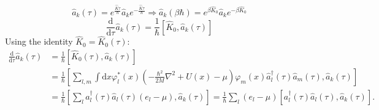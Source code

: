 \documentclass[11pt, a4paper]{article}
\newcommand{\dd}{\mathrm{d}}
\begin{document}
\begin{enumerate}
    \begin{equation*}
        \hat a_k(\tau) = e^{\frac{\hat K\tau}{\hbar}}\hat a_k e^{-\frac{\hat K\tau}{\hbar}}
        \Longrightarrow
        \hat a_k(\beta\hbar) = e^{\beta \hat K_0}\hat a_ke^{-\beta \hat K_0}
    \end{equation*}
    \begin{equation*}
        \frac{\dd}{\dd\tau}\hat a_k(\tau) = \frac{1}{\hbar}[\hat K_0, \hat a_k(\tau)]
    \end{equation*}
    Using the identity $\hat K_0 = \hat K_0(\tau)$:
    \begin{align*}
        \frac{\dd}{\dd\tau}\hat a_k(\tau) &= \frac{1}{\hbar}[\hat K_0(\tau), \hat a_k(\tau)]\\
        & = \frac{1}{\hbar}\left[\sum\limits_{l,m}\int\dd x \varphi^*_l(x) \left(-\frac{\hbar^2}{2M}\nabla^2 + U(x) - \mu\right)
        \varphi_m(x)\hat a_l^{\dagger}(\tau)\hat a_m(\tau), \hat a_k(\tau) \right] \\
        & = \frac{1}{\hbar}\left[\sum\limits_{l}a_l^{\dagger}(\tau)\hat a_l(\tau) (e_l - \mu), \hat a_k(\tau)\right]
        = \frac{1}{\hbar}\sum\limits_{l}(e_l - \mu) \left[a_l^{\dagger}(\tau)\hat a_l(\tau), \hat a_k(\tau)\right].
    \end{align*}
    

\end{enumerate}
\end{document}
